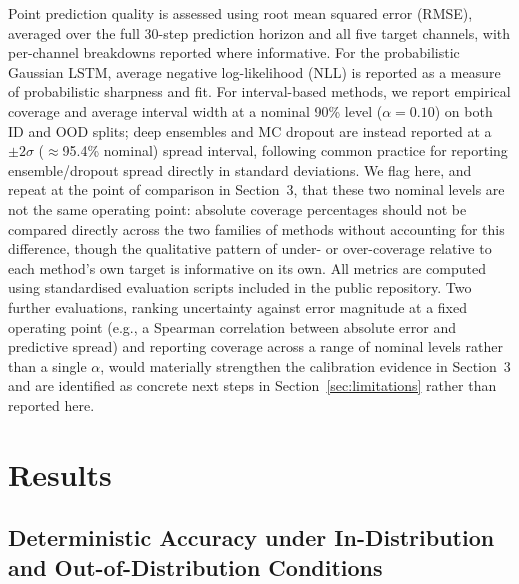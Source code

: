 \documentclass[a4paper,fleqn]{cas-sc}
\begin{document}
Point prediction quality is assessed using root mean squared error (RMSE), averaged over the full 30-step prediction horizon and all five target channels, with per-channel breakdowns reported where informative. For the probabilistic Gaussian LSTM, average negative log-likelihood (NLL) is reported as a measure of probabilistic sharpness and fit. For interval-based methods, we report empirical coverage and average interval width at a nominal 90\% level ($\alpha=0.10$) on both ID and OOD splits; deep ensembles and MC dropout are instead reported at a $\pm2\sigma$ ($\approx$95.4\% nominal) spread interval, following common practice for reporting ensemble/dropout spread directly in standard deviations. We flag here, and repeat at the point of comparison in Section~3, that these two nominal levels are not the same operating point: absolute coverage percentages should not be compared directly across the two families of methods without accounting for this difference, though the qualitative pattern of under- or over-coverage relative to each method's own target is informative on its own. All metrics are computed using standardised evaluation scripts included in the public repository. Two further evaluations, ranking uncertainty against error magnitude at a fixed operating point (e.g., a Spearman correlation between absolute error and predictive spread) and reporting coverage across a range of nominal levels rather than a single $\alpha$, would materially strengthen the calibration evidence in Section~3 and are identified as concrete next steps in Section~\ref{sec:limitations} rather than reported here.

\section{Results}

\subsection{Deterministic Accuracy under In-Distribution and Out-of-Distribution Conditions}
\label{sec:results-deterministic}
\end{document}
